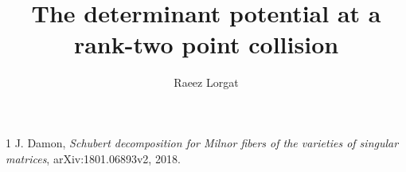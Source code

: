 \documentclass[11pt]{amsart}
\title{The determinant potential at a rank-two point collision}
\author{Raeez Lorgat}
\date{}
\begin{document}
\maketitle

\begin{thebibliography}{1}
J. Damon, \emph{Schubert decomposition for Milnor fibers of the varieties
of singular matrices}, arXiv:1801.06893v2, 2018.
\end{thebibliography}
\end{document}
